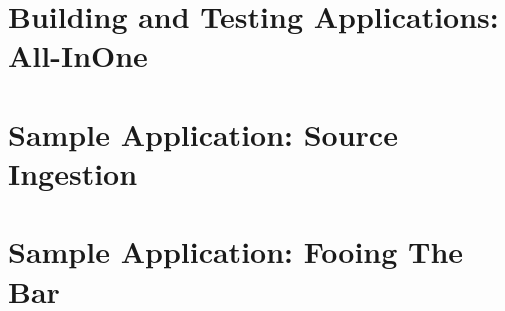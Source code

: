 \chapter{Building and Testing Applications: All-InOne}
\chapter{Sample Application: Source Ingestion}
\chapter{Sample Application:  Fooing The Bar}
